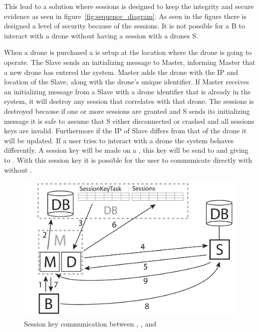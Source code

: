 This lead to a solution where sessions is designed to keep the integrity and secure evidence as seen in figure~\ref{fig:sequence_diagram}. 
As seen in the figure there is designed a level of security because of the sessions. It is not possible for a B to interact with a drone without having a session with a drones S.

When a drone is purchased a  is setup at the location where the drone is going to operate.
The Slave sends an initializing message to Master, informing Master that a new drone has entered the system.
Master adds the drone with the IP and location of the Slave, along with the drone's unique identifier.
If Master receives an initializing message from a Slave with a drone identifier that is already in the system, it will destroy any session that correlates with that drone. The sessions is destroyed because if one or more sessions are granted and S sends its initializing message it is safe to assume that S either disconnected or crashed and all sessions keys are invalid.
Furthermore if the IP of Slave differs from that of the drone it will be updated.
If a user tries to interact with a drone the system behaves differently. A session key will be made on a , this key will be send to  and giving to . With this session key it is possible for the user to communicate directly with  without .

\begin{figure}[!h]
    \centering 
    \includegraphics[width=\textwidth]{gfx/sessionkey_communication.pdf}
    \caption{Session key communication between , , and }
    \label{fig:sessionkey_communication}
\end{figure}

